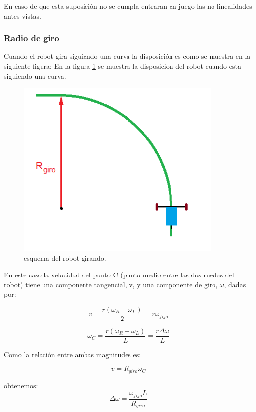 \documentclass[10pt,conference,a4paper,onecolumn]{article}%
\begin{document}
En caso de que esta suposición no se cumpla entraran en juego las no linealidades antes vistas.

\subsubsection{Radio de giro}
Cuando el robot gira siguiendo una curva la disposición es como se muestra en la siguiente figura:
En la figura \ref{fig:girando} se muestra la disposicion del robot cuando esta siguiendo una curva.
\begin{figure}[h]
\centering
\includegraphics[width=10cm]{./imagenes/carrito_girando.png}
\caption{esquema del robot girando.}
\label{fig:girando}
\end{figure}

En este caso la velocidad del punto  C (punto medio entre las dos ruedas del robot) tiene una componente tangencial, v, y una componente de giro, $\omega$, dadas por: 

\begin{equation}
v =\frac{r(\omega _R + \omega _L) }{2}=r \omega_{fijo}
\end{equation}

\begin{equation}
\omega_{C} =\frac{r(\omega _R - \omega _L) }{L}= \frac{  r \Delta \omega} {L}
\end{equation}

Como la relación entre ambas magnitudes es:


\begin{equation}
v=R_{giro} \omega_{C}
\end{equation}

obtenemos:
\begin{equation}
\Delta \omega= \frac{\omega_{fijo}L}{R_{giro}}
\end{equation}
\end{document}
